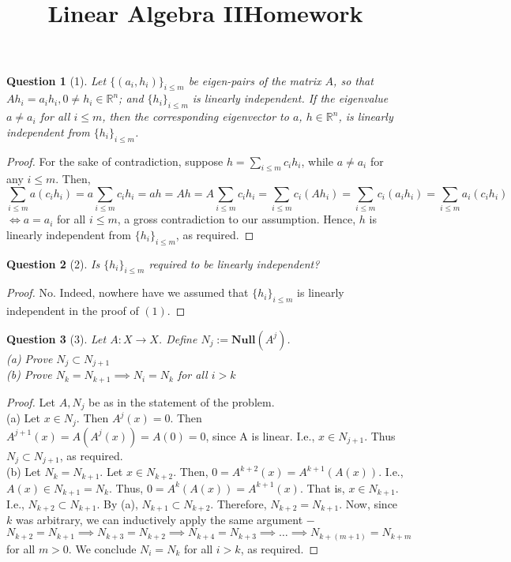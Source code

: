 \documentclass[11pt]{article}
\title{\vspace{-50pt}
\Huge \name
\\\vspace{20pt}
\huge Linear Algebra II\hfill Homework \hw}
\author{}
\date{}
\theoremstyle{quest}
\newtheorem*{question}{Question}
\begin{document}
\maketitle

\begin{question}[1]
Let $\{(a_i, h_i)\}_{i \le m}$ be eigen-pairs of the matrix $A$, so that $Ah_i = a_i h_i, 0 \ne h_i \in \mathbb{R}^n$; and $\{h_i\}_{i \le m}$ is linearly independent. If the eigenvalue $a \ne a_i$ for all $i \le m$, then the  corresponding eigenvector to $a$, $h \in \mathbb{R}^n$, is linearly independent from $\{h_i\}_{i \le m}$.
\end{question}
\begin{proof}
  For the sake of contradiction, suppose $h = \sum_{i \le m} c_i h_i$, while $a \ne a_i$ for any $i \le m$. Then,
  $$\sum_{i \le m} a (c_i h_i) = a \sum_{i \le m} c_i h_i = ah = Ah = A \sum_{i \le m} c_i h_i = \sum_{i \le m} c_i (A h_i) = \sum_{i \le m} c_i (a_i h_i) = \sum_{i \le m} a_i (c_i h_i)$$ $\iff a = a_i$ for all $i \le m$, a gross contradiction to our assumption. Hence, $h$ is linearly independent from $\{h_i\}_{i \le m}$, as required.
\end{proof}

\begin{question}[2]
Is $\{h_i\}_{i \le m}$ required to be linearly independent?
\end{question}
\begin{proof}
  No. Indeed, nowhere have we assumed that $\{h_i\}_{i \le m}$ is linearly independent in the proof of $(1)$.
\end{proof}

\begin{question}[3]
Let $A: X \rightarrow X$. Define $N_j := \mathbf{Null}(A^j)$.
\\(a) Prove $N_j \subset N_{j+1}$
\\(b) Prove $N_k = N_{k+1} \implies N_i = N_k$ for all $i > k$
\end{question}
\begin{proof}
  Let $A, N_j$ be as in the statement of the problem.
  \\(a) Let $x \in N_j$. Then $A^j(x) = 0$. Then $A^{j+1}(x) = A(A^j(x)) = A(0) = 0$, since A is linear. I.e., $x \in N_{j+1}$. Thus $N_j \subset N_{j+1}$, as required.
  \\(b) Let $N_k = N_{k+1}$. Let $x \in N_{k+2}$. Then, $0 = A^{k+2}(x) = A^{k+1}(A(x))$. I.e., $A(x) \in N_{k+1} = N_k$. Thus, $0 = A^k(A(x)) = A^{k+1}(x)$. That is, $x \in N_{k+1}$. I.e., $N_{k+2} \subset N_{k+1}$. By (a), $N_{k+1} \subset N_{k+2}$. Therefore, $N_{k+2} = N_{k+1}$. Now, since $k$ was arbitrary, we can inductively apply the same argument $-$ $$N_{k+2} = N_{k+1} \implies N_{k+3} = N_{k+2} \implies N_{k+4} = N_{k+3} \implies \ldots \implies N_{k+(m+1)} = N_{k+m}$$ for all $m > 0$. We conclude $N_i = N_k$ for all $i > k$, as required.
\end{proof}
\end{document}
